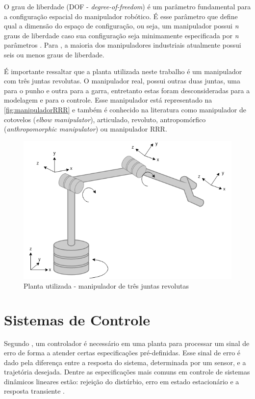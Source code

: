 O grau de liberdade (DOF - \textit{degree-of-freedom}) é um parâmetro fundamental para 
a configuração espacial do manipulador robótico. É esse parâmetro que define qual a dimensão do 
espaço de configuração, ou seja, um manipulador possui \textit{n} graus de liberdade caso sua 
configuração seja minimamente especificada por \textit{n} parâmetros \cite{Spong}. Para 
, a maioria dos manipuladores industriais atualmente possui seis 
ou menos graus de liberdade.

É importante ressaltar que a planta utilizada neste trabalho é um manipulador com três juntas
revolutas. O manipulador real, possui outras duas juntas, uma para o punho e outra para a garra, entretanto estas 
foram desconsideradas para a modelagem e para o controle. Esse manipulador está representado na \autoref{fig:manipuladorRRR} e 
também é conhecido na literatura como manipulador de cotovelos (\textit{elbow manipulator}), articulado, revoluto, 
antropomórfico (\textit{anthropomorphic manipulator}) ou manipulador RRR.

\begin{figure}[ht]
  \centering
  \includegraphics[width = 0.5\columnwidth]{Imagens/manipulador.png}
  \caption{Planta utilizada - manipulador de três juntas revolutas}
  \label{fig:manipuladorRRR} 
\end{figure}

\section{Sistemas de Controle}

Segundo , um controlador é necessário em uma planta 
para processar um sinal de erro de forma a atender certas especificações pré-definidas. 
Esse sinal de erro é dado pela diferença entre a resposta do sistema, 
determinada por um sensor, e a trajetória desejada. Dentre as especificações mais 
comuns em controle de sistemas dinâmicos lineares estão: rejeição do 
distúrbio, erro em estado estacionário e a resposta transiente \cite{Ogata}.

